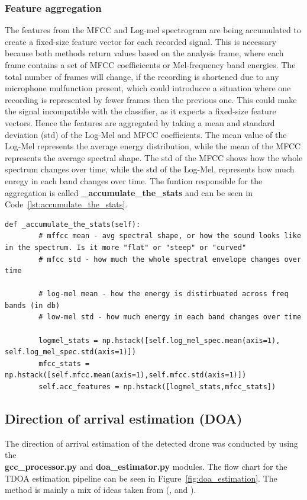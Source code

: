     \subsubsection{Feature aggregation}
    The features from the MFCC and Log-mel spectrogram are being accumulated to create a fixed-size feature vector for each recorded signal. This is necessary because both methods return values based on the analysis frame, where each frame contains a set of MFCC coeffieicents or Mel-frequency band energies. The total number of frames will change, if the recording is shortened due to any microphone mulfunction present, which could introducce a situation where one recording is represented by fewer frames then the previous one. This could make the signal incompatible with the classifier, as it expects a fixed-size feature vectors. Hence the features are aggregated by taking a mean and standard deviation (std) of the Log-Mel and MFCC coefficients. The mean value of the Log-Mel represents the average energy distribution, while the mean of the MFCC represents the average spectral shape. The std of the MFCC shows how the whole spectrum changes over time, while the std of the Log-Mel, represents how much enregy in each band changes over time. The funtion responsible for the aggregation is called \textbf{\_accumulate\_the\_stats} and can be seen in Code~\ref{lst:accumulate_the_stats}.
    
    \begin{lstlisting}[style=pythonstyle, caption={Function used for feature accumulation}, label={lst:accumulate_the_stats}]
    def _accumulate_the_stats(self):
        # mffcc mean - avg spectral shape, or how the sound looks like in the spectrum. Is it more "flat" or "steep" or "curved"
        # mfcc std - how much the whole spectral envelope changes over time 

        # log-mel mean - how the energy is distirbuated across freq bands (in db)
        # low-mel std - how much energy in each band changes over time

        logmel_stats = np.hstack([self.log_mel_spec.mean(axis=1), self.log_mel_spec.std(axis=1)])
        mfcc_stats = np.hstack([self.mfcc.mean(axis=1),self.mfcc.std(axis=1)])
        self.acc_features = np.hstack([logmel_stats,mfcc_stats])
    \end{lstlisting}

    
\subsection{Direction of arrival estimation (DOA)}
The direction of arrival estimation of the detected drone was conducted by using the\\ \textbf{gcc\_processor.py} and \textbf{doa\_estimator.py} modules. The flow chart for the TDOA estimation pipeline can be seen in Figure~\ref{fig:doa_estimation}. The method is mainly a mix of ideas taken from (\cite{kwon2010gccphat}, \cite{kang2016prefiltering} and \cite{blandin2012multisource}). 

